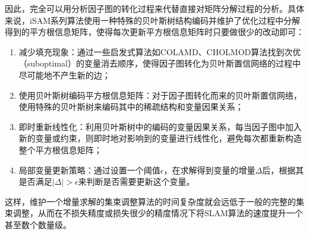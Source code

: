 因此，完全可以用分析因子图的转化过程来代替直接对矩阵分解过程的分析。具体来说，iSAM系列算法使用一种特殊的贝叶斯树结构编码并维护了优化过程中分解得到的平方根信息矩阵，使得每次更新平方根信息矩阵时只要做很少的改动即可：
\begin{enumerate}
    \item 减少填充现象：通过一些启发式算法如COLAMD\citep{davis2004algorithm}、CHOLMOD\citep{chen2008algorithm}算法找到次优（suboptimal）的变量消去顺序，使得因子图转化为贝叶斯置信网络的过程中尽可能地不产生新的边；
    \item 使用贝叶斯树编码平方根信息矩阵：对于因子图转化而来的贝叶斯置信网络，使用特殊的贝叶斯树来编码其中的稀疏结构和变量因果关系；
    \item 即时重新线性化：利用贝叶斯树中的编码的变量因果关系，每当因子图中加入新的变量或约束，则即时地对影响到的变量进行线性化，避免每次都重新构造整个平方根信息矩阵；
    \item 局部变量更新策略：通过设置一个阈值$\epsilon$，在求解得到变量的增量$\Delta$后，根据其是否满足$|\Delta|>\epsilon$来判断是否需要更新这个变量。
\end{enumerate}

这样，维护一个增量求解的集束调整算法的时间复杂度就会远低于一般的完整的集束调整，从而在不损失精度或损失很少的精度情况下将SLAM算法的速度提升一个甚至数个数量级。
